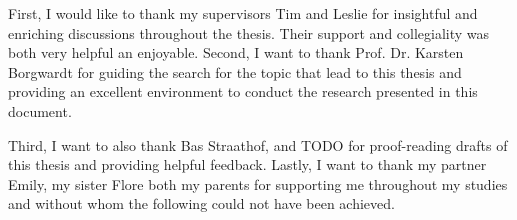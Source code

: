 First, I would like to thank my supervisors Tim and Leslie for insightful and
enriching discussions throughout the thesis. Their support and collegiality was
both very helpful an enjoyable. Second, I want to thank Prof. Dr. Karsten Borgwardt
for guiding the search for the topic that lead to this thesis and providing an
excellent environment to conduct the research presented in this document.

Third, I want to also thank Bas Straathof, and TODO for proof-reading drafts of this
thesis and providing helpful feedback. Lastly, I want to thank my partner Emily,
my sister Flore both my parents for supporting me throughout my studies and
without whom the following could not have been achieved.
